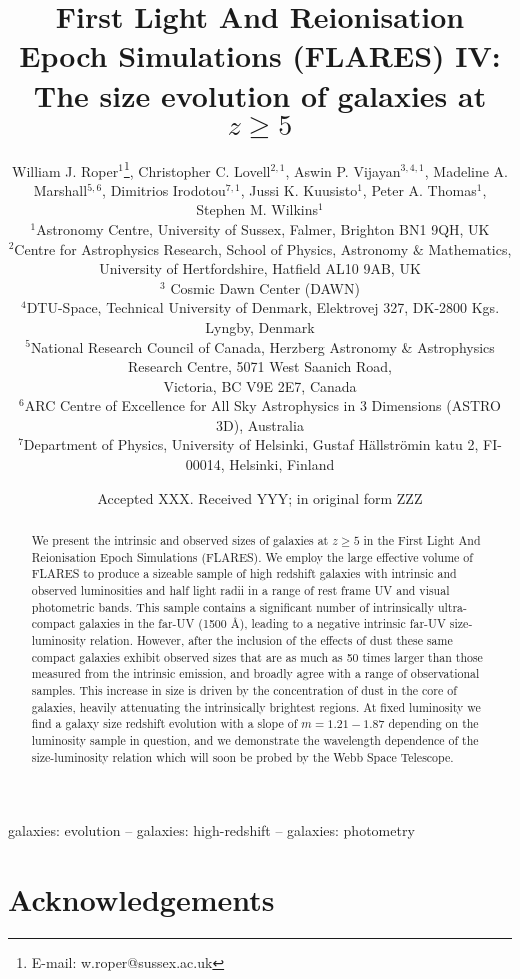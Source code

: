 \documentclass[fleqn,usenatbib]{mnras}
\title[FLARES IV]{First Light And Reionisation Epoch Simulations (FLARES) IV: The size evolution of galaxies at $z\geq5$}
\author[William J. Roper et al.]{William J. Roper$^{1}$\thanks{E-mail: w.roper@sussex.ac.uk},
Christopher C. Lovell$^{2,1}$,
Aswin P. Vijayan$^{3,4,1}$,
Madeline A. Marshall$^{5, 6}$,
\newauthor 
Dimitrios Irodotou$^{7,1}$, 
Jussi K. Kuusisto$^{1}$,
Peter A. Thomas$^{1}$,
Stephen M. Wilkins$^{1}$
\newauthor 
\\
$^{1}$Astronomy Centre, University of Sussex, Falmer, Brighton BN1 9QH, UK\\
$^{2}$Centre for Astrophysics Research, School of Physics, Astronomy $\&$ Mathematics, University of Hertfordshire, Hatfield AL10 9AB, UK\\
$^{3}$ Cosmic Dawn Center (DAWN) \\
$^{4}$DTU-Space, Technical University of Denmark, Elektrovej 327, DK-2800 Kgs. Lyngby, Denmark \\
$^{5}$National Research Council of Canada, Herzberg Astronomy \& Astrophysics Research Centre, 5071 West Saanich Road, \\ Victoria, BC V9E 2E7, Canada \\
$^{6}$ARC Centre of Excellence for All Sky Astrophysics in 3 Dimensions (ASTRO 3D), Australia \\
$^{7}$Department of Physics, University of Helsinki, Gustaf Hällströmin katu 2, FI-00014, Helsinki, Finland \\
}
\date{Accepted XXX. Received YYY; in original form ZZZ}
\begin{document}
\label{firstpage}
\pagerange{\pageref{firstpage}--\pageref{lastpage}}
\maketitle

\begin{abstract}
We present the intrinsic and observed sizes of galaxies at $z\geq5$ in the First Light And Reionisation Epoch Simulations (FLARES). 
We employ the large effective volume of FLARES to produce a sizeable sample of high redshift galaxies with intrinsic and observed luminosities and half light radii in a range of rest frame UV and visual photometric bands. This sample contains a significant number of intrinsically ultra-compact galaxies in the far-UV (1500 \AA), leading to a negative intrinsic far-UV size-luminosity relation. However, after the inclusion of the effects of dust these same compact galaxies exhibit observed sizes that are as much as 50 times larger than those measured from the intrinsic emission, and broadly agree with a range of observational samples. This increase in size is driven by the concentration of dust in the core of galaxies, heavily attenuating the intrinsically brightest regions. At fixed luminosity we find a galaxy size redshift evolution with a slope of $m=1.21-1.87$ depending on the luminosity sample in question, and we demonstrate the wavelength dependence of the size-luminosity relation which will soon be probed by the Webb Space Telescope.
\end{abstract}

\begin{keywords}
galaxies: evolution -- galaxies: high-redshift -- galaxies: photometry
\end{keywords}













\section*{Acknowledgements}
\end{document}
